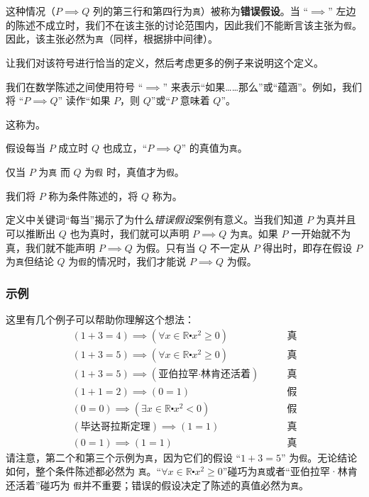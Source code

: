 这种情况（$P \implies Q$ 列的第三行和第四行为\verb|真|）被称为\textbf{错误假设}。当 ``$\implies$'' 左边的陈述不成立时，我们不在该主张的讨论范围内，因此我们不能断言该主张为\verb|假|。因此，该主张必然为\verb|真|（同样，根据排中间律）。

让我们对该符号进行恰当的定义，然后考虑更多的例子来说明这个定义。

\begin{definition}
    我们在数学陈述之间使用符号 ``$\implies$'' 来表示``如果……那么''或``蕴涵''。例如，我们将 ``$P \implies Q$'' 读作``如果 $P$，则 $Q$''或``$P$ 意味着 $Q$''。

    这称为。

    假设每当 $P$ 成立时 $Q$ 也成立，``$P \implies Q$'' 的真值为\verb|真|。

    仅当 $P$ 为\verb|真| 而 $Q$ 为\verb|假| 时，真值才为\verb|假|。

    我们将 $P$ 称为条件陈述的，将 $Q$ 称为。
\end{definition}

定义中关键词``每当''揭示了为什么\emph{错误假设}案例有意义。当我们知道 $P$ 为真并且可以推断出 $Q$ 也为真时，我们就可以声明 $P \implies Q$ 为\verb|真|。如果 $P$ 一开始就不为真，我们就不能声明 $P \implies Q$ 为假。只有当 $Q$ 不一定从 $P$ 得出时，即存在假设 $P$ 为\verb|真|但结论 $Q$ 为\verb|假|的情况时，我们才能说 $P \implies Q$ 为假。

\subsubsection*{示例}

这里有几个例子可以帮助你理解这个想法：
\begin{align*}
    (1 + 3 = 4) \implies (\forall x \in \mathbb{R} \centerdot x^2 \ge 0)  \qquad &\text{真} \\
    (1 + 3 = 5) \implies (\forall x \in \mathbb{R} \centerdot x^2 \ge 0)  \qquad &\text{真} \\
    (1 + 3 = 5) \implies (\text{亚伯拉罕·林肯还活着})  \qquad &\text{真} \\
    (1 + 1 = 2) \implies (0 = 1)  \qquad &\text{假} \\
    (0 = 0) \implies (\exists x \in \mathbb{R} \centerdot x^2 < 0)  \qquad &\text{假} \\
    (\text{毕达哥拉斯定理}) \implies (1 = 1)  \qquad &\text{真} \\
    (0 = 1) \implies (1 = 1)  \qquad &\text{真}
\end{align*}
请注意，第二个和第三个示例为\verb|真|，因为它们的假设 ``$1 + 3 = 5$'' 为\verb|假|。无论结论如何，整个条件陈述都必然为 \verb|真|。``$\forall x \in \mathbb{R} \centerdot x^2 \ge 0$''碰巧为\verb|真|或者``亚伯拉罕·林肯还活着''碰巧为 \verb|假|并不重要；错误的假设决定了陈述的真值必然为\verb|真|。

